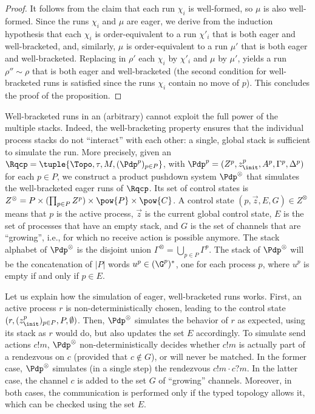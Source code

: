 \documentclass{LMCS}
\begin{document}
\begin{proof}
  It follows from the claim that each run $\chi_i$ is well-formed, so
  $\mu$ is also well-formed.  Since the runs
  $\chi_i$ and $\mu$ are eager, we derive from the induction
  hypothesis that each $\chi_i$ is order-equivalent to a run $\chi'_i$
  that is both eager and well-bracketed, and, similarly, $\mu$ is
  order-equivalent to a run $\mu'$ that is both eager and
  well-bracketed.  Replacing in $\rho'$ each $\chi_i$ by $\chi'_i$ and
  $\mu$ by $\mu'$,  yields a run $\rho'' \sim
  \rho$ that is both eager and well-bracketed (the second condition
  for well-bracketed runs is satisfied since the runs $\chi_i$ contain
  no move of $p$).  This concludes the
  proof of the proposition.
\end{proof}



Well-bracketed runs in an (arbitrary) \rqcp cannot exploit the full
power of the multiple stacks.  Indeed, the well-bracketing property
ensures that the individual process stacks do not ``interact'' with
each other: a single, global stack is sufficient to simulate the run.
More precisely, given an \rqcp $\Rqcp =
\tuple{\Topo,\tau,M,(\Pdp^p)_{p\in P}}$, with
$\Pdp^p=(Z^p,z^p_\init,A^p,\Gamma^p,\Delta^p)$ for each $p \in P$, we
construct a product pushdown system $\Pdp^\otimes$ that simulates the
well-bracketed eager runs of $\Rqcp$.  Its set of control states is
$Z^\otimes = P \times (\prod_{p\in P} Z^p) \times \pow{P} \times
\pow{C}$.  A control state $(p, \vec{z}, E, G) \in Z^\otimes$ means
that $p$ is the active process, $\vec{z}$ is the current global
control state, $E$ is the set of processes that have an empty 
stack, and $G$ is the set of channels that are ``growing'', i.e., for
which no receive action is possible anymore.  The stack alphabet of
$\Pdp^\otimes$ is the disjoint union $\Gamma^\otimes = \bigcup_{p \in P} \Gamma^p$. The
stack of $\Pdp^\otimes$ will be the concatenation of $|P|$
words $u^p \in(\G^p)^*$, one for each process $p$, where $u^p$ is empty if
and only if $p \in E$.

Let us explain how the simulation of eager, well-bracketed runs works.
First, an active process $r$ is non-deterministically chosen, leading
to the control state $(r, (z^p_\init)_{p \in P}, P, \emptyset)$.
Then, $\Pdp^\otimes$ simulates the behavior of $r$ as expected, using
its stack as $r$ would do, but also updates the set $E$ accordingly. 
To simulate send actions $c!m$, $\Pdp^\otimes$ non-deterministically
decides whether $c!m$ is actually part of a rendezvous  on $c$
(provided that $c \not\in G$), or will never be matched. 
In the former case, $\Pdp^\otimes$ simulates (in a single step) the
rendezvous $c!m \cdot c?m$.
In the latter case, the channel $c$ is added to the set $G$ of
``growing'' channels. 
Moreover, in both cases, the communication is performed only if the
typed topology allows it, which can be checked using the set $E$. 
\end{document}
